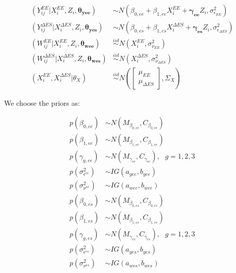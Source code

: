 \documentclass[11pt]{article}\usepackage[]{graphicx}\usepackage[]{color}
\begin{document}
\begin{align}
  (Y_{ij}^{EE}|X_i^{EE}, Z_i,\boldsymbol{\theta_{yee}}) &\sim N(\beta_{0,ee} + \beta_{1,ee}X_i^{EE} + \boldsymbol{\gamma_{ee}}Z_i, \sigma_{\epsilon_{EE}}^2) \\
  (Y_{ij}^{\Delta ES}|X_i^{\Delta ES}, Z_i,\boldsymbol{\theta_{yes}}) &\sim N(\beta_{0,es} + \beta_{1,es}X_i^{\Delta ES} +  \boldsymbol{\gamma_{es}}Z_i, \sigma_{\epsilon_{\Delta ES}}^2) \\
  (W_{ij}^{EE}|X_i^{EE}, Z_i,\boldsymbol{\theta_{wee}}) &\overset{iid}{\sim} N(X_i^{EE}, \sigma_{\nu_{EE}}^2 ) \\
  (W_{ij}^{\Delta ES}|X_i^{\Delta ES}, Z_i,\boldsymbol{\theta_{wes}}) &\overset{iid}{\sim} N(X_i^{\Delta ES}, \sigma_{\nu_{\Delta ES}}^2 )  \\
  (X_i^{EE},X_i^{\Delta ES}|\theta_X) &\overset{iid}{\sim} N\left(
  \begin{bmatrix}
  \mu_{EE}\\
  \mu_{\Delta ES}
  \end{bmatrix}
  , \Sigma_X
  \right)
\end{align}

We choose the priors as:

\begin{multicols}{2}
\noindent 
  \begin{align}
  p(\beta_{0,ee}) &\sim N(M_{\beta_{0,ee}},C_{\beta_{0,ee}}) \\
  p(\beta_{1,ee}) &\sim N(M_{\beta_{1,ee}},C_{\beta_{1,ee}}) \\
  p(\gamma_{g,ee}) &\sim N(M_{\gamma_{ee}},C_{\gamma_{ee}}), \text{ } g=1,2,3 \\
  p(\sigma^2_{\epsilon^{ee}}) &\sim IG(a_{yee},b_{yee}) \\
  p(\sigma^2_{\nu^{ee}}) &\sim IG(a_{wee},b_{wee}) 
\end{align}
\columnbreak
\begin{align}
  p(\beta_{0,es}) &\sim N(M_{\beta_{0,es}},C_{\beta_{0,es}}) \\
  p(\beta_{1,es}) &\sim N(M_{\beta_{1,es}},C_{\beta_{1,es}}) \\
  p(\gamma_{g,es}) &\sim N(M_{\gamma_{es}},C_{\gamma_{es}}), \text{ } g=1,2,3 \\
  p(\sigma^2_{\epsilon^{es}}) &\sim IG(a_{yes},b_{yes}) \\
  p(\sigma^2_{\nu^{es}}) &\sim IG(a_{wes},b_{wes}) 
  \end{align}
\end{multicols}
\end{document}
